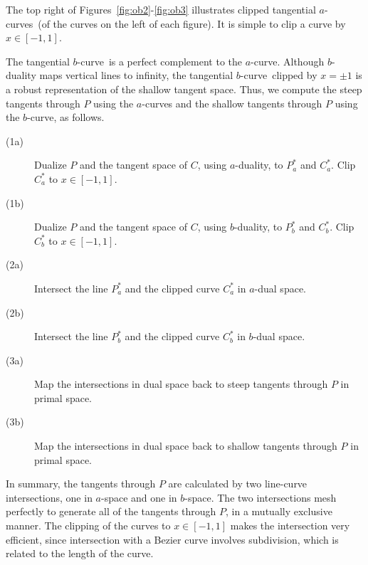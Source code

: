 \documentclass[11pt]{article}
\newcommand{\btang}{tangential $b$-curve\ }
\newcommand{\atangs}{tangential $a$-curves\ }
\begin{document}
The top right of Figures~\ref{fig:ob2}-\ref{fig:ob3} illustrates
clipped \atangs (of the curves on the left of each figure).
It is simple to clip a curve by $x \in [-1,1]$.

The \btang is a perfect complement to the $a$-curve.
Although $b$-duality maps vertical lines to infinity,
the \btang clipped by $x = \pm 1$ is a robust representation of the 
shallow tangent space.
Thus, we compute the steep tangents through $P$ using the $a$-curves
and the shallow tangents through $P$ using the $b$-curve, as follows.
%
\begin{description}
\item[(1a)]	Dualize $P$ and the tangent space of $C$, using $a$-duality,
		to $P_a^*$ and $C_a^*$.  Clip $C_a^*$ to $x \in [-1,1]$.
\item[(1b)]	Dualize $P$ and the tangent space of $C$, using $b$-duality,
		to $P_b^*$ and $C_b^*$.  Clip $C_b^*$ to $x \in [-1,1]$.
\item[(2a)]	Intersect the line $P_a^*$ and the clipped curve $C_a^*$ 
		in $a$-dual space.
\item[(2b)]	Intersect the line $P_b^*$ and the clipped curve 
		$C_b^*$ in $b$-dual space.
\item[(3a)]	Map the intersections in dual space 
		back to steep tangents through $P$ in primal space.
\item[(3b)]	Map the intersections in dual space 
		back to shallow tangents through $P$ in primal space.
\end{description}


In summary, the tangents through $P$ are calculated by two line-curve
intersections, one in $a$-space and one in $b$-space.
The two intersections mesh perfectly to generate all of the 
tangents through $P$, in a mutually exclusive manner.
The clipping of the curves to $x \in [-1,1]$ makes the intersection very efficient,
since intersection with a Bezier curve involves subdivision,
which is related to the length of the curve.
\end{document}
